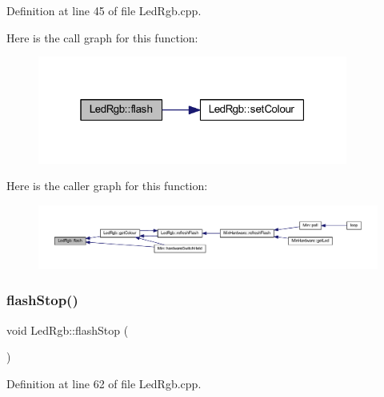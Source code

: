 Definition at line 45 of file Led\+Rgb.\+cpp.

Here is the call graph for this function\+:
\nopagebreak
\begin{figure}[H]
\begin{center}
\leavevmode
\includegraphics[width=289pt]{dc/d6d/class_led_rgb_a8d81b6020efb6e5f786542451d4dffbc_cgraph}
\end{center}
\end{figure}
Here is the caller graph for this function\+:
\nopagebreak
\begin{figure}[H]
\begin{center}
\leavevmode
\includegraphics[width=350pt]{dc/d6d/class_led_rgb_a8d81b6020efb6e5f786542451d4dffbc_icgraph}
\end{center}
\end{figure}
\mbox{\label{class_led_rgb_a096a0af0eb4d3c5d4c6a3f4b3aaeb9e7}} 
\subsubsection{\texorpdfstring{flash\+Stop()}{flashStop()}}
{\footnotesize\ttfamily void Led\+Rgb\+::flash\+Stop (\begin{DoxyParamCaption}{ }\end{DoxyParamCaption})}



Definition at line 62 of file Led\+Rgb.\+cpp.

